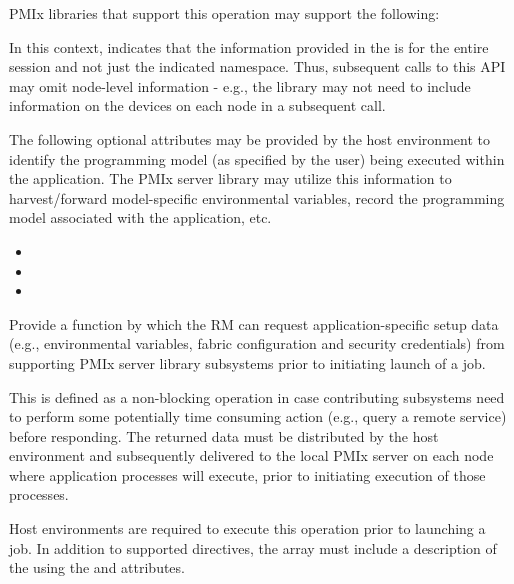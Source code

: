 \optattrstart
\ac{PMIx} libraries that support this operation may support the following:

In this context, indicates that the information provided in the  is for the entire session and not just the indicated namespace. Thus, subsequent calls to this \ac{API} may omit node-level information - e.g., the library may not need to include information on the devices on each node in a subsequent call.
\pasteAttributeItemEnd

The following optional attributes may be provided by the host environment to identify the programming model (as specified by the user) being executed within the application. The \ac{PMIx} server library may utilize this information to harvest/forward model-specific environmental variables, record the programming model associated with the application, etc.

\begin{itemize}
    \item {}
    \item {}
    \item {}
\end{itemize}

\optattrend

\descr

Provide a function by which the \ac{RM} can request application-specific setup data (e.g., environmental variables, fabric configuration and security credentials) from supporting \ac{PMIx} server library subsystems prior to initiating launch of a job.

This is defined as a non-blocking operation in case contributing subsystems need to perform some potentially time consuming action (e.g., query a remote service) before responding. The returned data must be distributed by the host environment and subsequently delivered to the local \ac{PMIx} server on each node where application processes will execute, prior to initiating execution of those processes.

\advicermstart
Host environments are required to execute this operation prior to launching a job. In addition to supported directives, the  array must include a description of the  using the  and  attributes.

